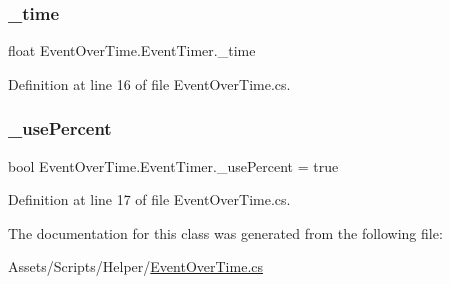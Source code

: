 \subsubsection{\texorpdfstring{\+\_\+time}{\_time}}
{\footnotesize\ttfamily float Event\+Over\+Time.\+Event\+Timer.\+\_\+time}



Definition at line 16 of file Event\+Over\+Time.\+cs.

\mbox{\label{class_event_over_time_1_1_event_timer_a340cce92f5d7e5dde506511c56df9ea1}} 
\subsubsection{\texorpdfstring{\+\_\+use\+Percent}{\_usePercent}}
{\footnotesize\ttfamily bool Event\+Over\+Time.\+Event\+Timer.\+\_\+use\+Percent = true}



Definition at line 17 of file Event\+Over\+Time.\+cs.



The documentation for this class was generated from the following file\+:\begin{DoxyCompactItemize}
\item 
Assets/\+Scripts/\+Helper/\mbox{\hyperlink{_event_over_time_8cs}{Event\+Over\+Time.\+cs}}\end{DoxyCompactItemize}

